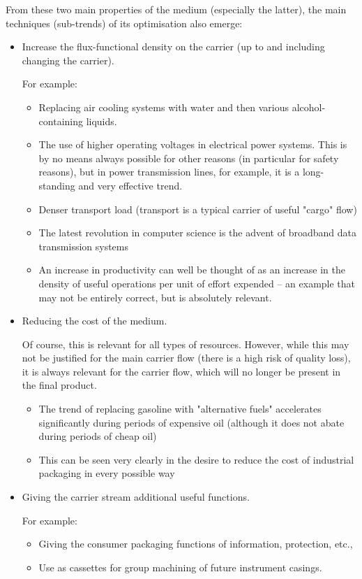 \documentclass[a4paper,11pt]{article}
\begin{document}
From these two main properties of the medium (especially the latter), the main
techniques (sub-trends) of its optimisation also emerge:
\begin{itemize}
\item Increase the flux-functional density on the carrier (up to and including
  changing the carrier).

  For example:
  \begin{itemize}
  \item Replacing air cooling systems with water and then various
    alcohol-containing liquids.
  \item The use of higher operating voltages in electrical power systems. This
    is by no means always possible for other reasons (in particular for safety
    reasons), but in power transmission lines, for example, it is a
    long-standing and very effective trend.
  \item Denser transport load (transport is a typical carrier of useful
    "cargo" flow)
  \item The latest revolution in computer science is the advent of broadband
    data transmission systems
  \item An increase in productivity can well be thought of as an increase in
    the density of useful operations per unit of effort expended -- an example
    that may not be entirely correct, but is absolutely relevant.
  \end{itemize}
\item Reducing the cost of the medium.

  Of course, this is relevant for all types of resources. However, while this
  may not be justified for the main carrier flow (there is a high risk of
  quality loss), it is always relevant for the carrier flow, which will no
  longer be present in the final product.
  \begin{itemize}
  \item The trend of replacing gasoline with "alternative fuels" accelerates
    significantly during periods of expensive oil (although it does not abate
    during periods of cheap oil)
  \item This can be seen very clearly in the desire to reduce the cost of
    industrial packaging in every possible way
  \end{itemize}
\item Giving the carrier stream additional useful functions.

  For example:
  \begin{itemize}
  \item Giving the consumer packaging functions of information, protection,
    etc.,
  \item Use as cassettes for group machining of future instrument casings.
  \end{itemize}
\end{itemize}
\end{document}
